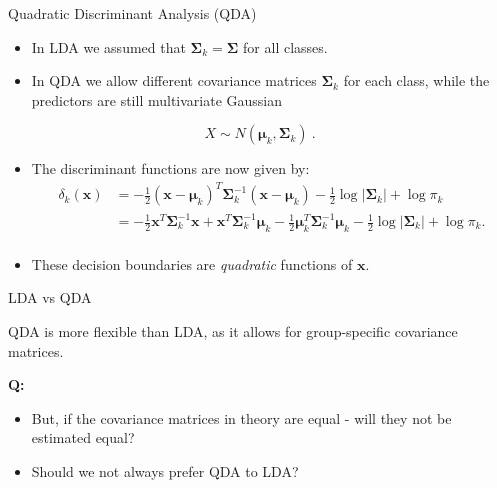 \documentclass[
  10pt,
  ignorenonframetext,
]{beamer}
\providecommand{\tightlist}{%
  \setlength{\itemsep}{0pt}\setlength{\parskip}{0pt}}
\begin{document}
\begin{frame}{Quadratic Discriminant Analysis (QDA)}
\protect\hypertarget{quadratic-discriminant-analysis-qda}{}
\begin{itemize}
\item
  In LDA we assumed that \(\boldsymbol{\Sigma}_k = \boldsymbol{\Sigma}\)
  for all classes.
\item
  In QDA we allow different covariance matrices
  \(\boldsymbol{\Sigma}_k\) for each class, while the predictors are
  still multivariate Gaussian
\end{itemize}

\[X \sim N(\boldsymbol{\mu}_k, \boldsymbol{\Sigma}_k) \ .\]

\begin{itemize}
\item
  The discriminant functions are now given by: \vspace{-3mm}
  \begin{align*} \delta_k({\boldsymbol x}) &= -\frac{1}{2}({\boldsymbol x}-\boldsymbol{\mu}_k)^T \boldsymbol{\Sigma}_k^{-1}({\boldsymbol x}-\boldsymbol{\mu}_k)-\frac{1}{2}\log |\boldsymbol{\Sigma}_k| + \log \pi_k \\ 
  &= -\frac{1}{2} {\boldsymbol x}^T \boldsymbol{\Sigma}_k^{-1}{\boldsymbol x} + {\boldsymbol x}^T \boldsymbol{\Sigma}_k^{-1}\boldsymbol{\mu}_k - \frac{1}{2} \boldsymbol{\mu}_k^T \boldsymbol{\Sigma}_k^{-1}\boldsymbol{\mu}_k - \frac{1}{2}\log |\boldsymbol{\Sigma}_k | + \log \pi_k.\\
  \end{align*}
\item
  These decision boundaries are \emph{quadratic} functions of
  \({\boldsymbol x}\).
\end{itemize}
\end{frame}

\begin{frame}
\begin{block}{LDA vs QDA}
\protect\hypertarget{lda-vs-qda}{}
\vspace{2mm}

QDA is more flexible than LDA, as it allows for group-specific
covariance matrices.

\vspace{4mm}

\textbf{Q:}

\begin{itemize}
\tightlist
\item
  But, if the covariance matrices in theory are equal - will they not be
  estimated equal?
\item
  Should we not always prefer QDA to LDA?
\end{itemize}
\end{block}
\end{frame}
\end{document}
